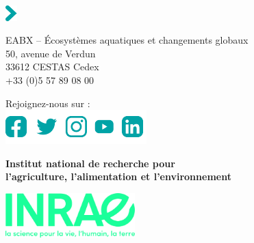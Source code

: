 \thispagestyle{empty}
\begin{center}
\color{inrae}
\vspace*{12cm}
\includegraphics[height=0.6cm]{fleche-titre}\par
\sffamily
EABX -- Écosystèmes aquatiques et changements globaux\\
50, avenue de Verdun\\
33612 CESTAS Cedex\\
+33 (0)5 57 89 08 00\par\bigskip
Rejoignez-nous sur :\\
\includegraphics{reseaux-sociaux}\par\bigskip
\vspace*{2cm}
{\bfseries Institut national de recherche pour\\
l'agriculture, l'alimentation et l'environnement}\par\bigskip
\vspace*{2cm}
\includegraphics[width=5cm]{blocmarque.jpg}




\end{center}
\restoregeometry
